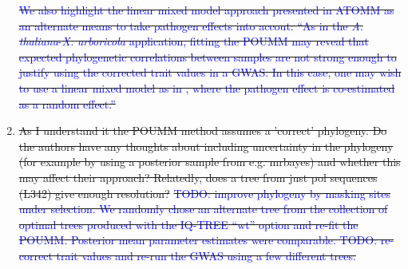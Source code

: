 \documentclass[12pt]{article} %
\providecommand{\DIFdel}[1]{{\protect\color{red}\sout{#1}}}                      %
\begin{document}
\begin{enumerate}
\DIFdel{\textcolor{blue}{We also highlight the linear mixed model approach presented in ATOMM as an alternate means to take pathogen effects into accout: ``As in the \emph{A. thaliana}-\emph{X. arboricola} application, fitting the POUMM may reveal that expected phylogenetic correlations between samples are not strong enough to justify using the corrected trait values in a GWAS. In this case, one may wish to use a linear mixed model as in \citep{Wang2018Two-wayGenomes}, where the pathogen effect is co-estimated as a random effect.''}
    }%
\item%
\DIFdel{As I understand it the POUMM method assumes a 'correct' phylogeny. Do the authors have any thoughts about including uncertainty in the phylogeny (for example by using a posterior sample from e.g. mrbayes) and whether this may affect their approach? Relatedly, does a tree from just pol sequences (L342) give enough resolution? }%
\DIFdel{\textcolor{blue}{TODO: improve phylogeny by masking sites under selection. We randomly chose an alternate tree from the collection of optimal trees produced with the IQ-TREE ``wt'' option and re-fit the POUMM. Posterior mean parameter estimates were comparable. TODO: re-correct trait values and re-run the GWAS using a few different trees.}
    }%


\end{enumerate}
\end{document}
